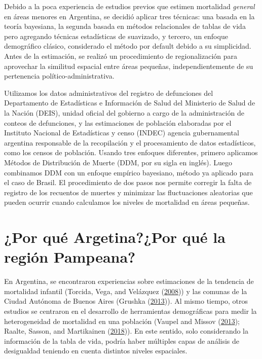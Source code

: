\documentclass[12pt,]{article}
\begin{document}
Debido a la poca experiencia de estudios previos que estimen mortalidad
\emph{general} en áreas menores en Argentina, se decidió aplicar tres
técnicas: una basada en la teoría bayesiana, la segunda basada en
métodos relacionales de tablas de vida pero agregando técnicas
estadísticas de suavizado, y tercero, un enfoque demográfico clásico,
considerado el método por default debido a su simplicidad. Antes de la
estimación, se realizó un procedimiento de regionalización para
aprovechar la similitud espacial entre áreas pequeñas,
independientemente de su pertenencia político-administrativa.

Utilizamos los datos administrativos del registro de defunciones del
Departamento de Estadísticas e Información de Salud del Ministerio de
Salud de la Nación (DEIS), unidad oficial del gobierno a cargo de la
administración de conteos de defunciones, y las estimaciones de
población elaboradas por el Instituto Nacional de Estadísticas y censo
(INDEC) agencia gubernamental argentina responsable de la recopilación y
el procesamiento de datos estadísticos, como los censos de población.
Usando tres enfoques diferentes, primero aplicamos Métodos de
Distribución de Muerte (DDM, por su sigla en inglés). Luego combinamos
DDM con un enfoque empírico bayesiano, método ya aplicado para el caso
de Brasil. El procedimiento de dos pasos nos permite corregir la falta
de registro de los recuentos de muertes y minimizar las fluctuaciones
aleatorias que pueden ocurrir cuando calculamos los niveles de
mortalidad en áreas pequeñas.

\hypertarget{por-quuxe9-argetinapor-quuxe9-la-regiuxf3n-pampeana}{%
\section{¿Por qué Argetina?¿Por qué la región
Pampeana?}\label{por-quuxe9-argetinapor-quuxe9-la-regiuxf3n-pampeana}}

En Argentina, se encontraron experiencias sobre estimaciones de la
tendencia de mortalidad infantil (Torcida, Vega, and Velázquez
(\protect\hyperlink{ref-torcida2008}{2008})) y las comunas de la Ciudad
Autónoma de Buenos Aires (Grushka
(\protect\hyperlink{ref-Grushka2013}{2013})). Al mismo tiempo, otros
estudios se centraron en el desarrollo de herramientas demográficas para
medir la heterogeneidad de mortalidad en una población (Vaupel and
Missov (\protect\hyperlink{ref-Vaupel_Missov_2013}{2013}); Raalte,
Sasson, and Martikainen
(\protect\hyperlink{ref-vanRaalte_Sasson_Martikainen_2018}{2018})). En
este sentido, solo considerando la información de la tabla de vida,
podría haber múltiples capas de análisis de desigualdad teniendo en
cuenta distintos niveles espaciales.
\end{document}
